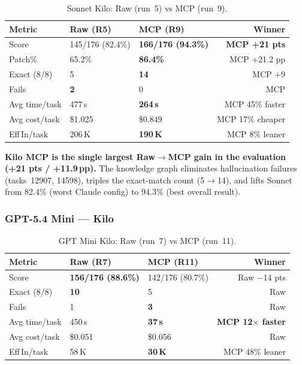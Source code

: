 \begin{table}[h]
\centering
\caption{Sonnet Kilo: Raw (run~5) vs MCP (run~9).}\label{tab:delta-sonnet-kilo}
\begin{tabular}{lllr}
\toprule
\textbf{Metric} & \textbf{Raw (R5)} & \textbf{MCP (R9)} & \textbf{Winner} \\
\midrule
Score          & 145/176 (82.4\%) & \textbf{166/176 (94.3\%)} & \textbf{MCP +21 pts} \\
Patch\%        & 65.2\%           & \textbf{86.4\%}            & MCP +21.2 pp \\
Exact (8/8)    & 5                & \textbf{14}                & MCP +9 \\
Fails          & \textbf{2}       & 0                          & MCP \\
Avg time/task  & 477\,s           & \textbf{264\,s}            & MCP 45\% faster \\
Avg cost/task  & \$1.025          & \$0.849                    & MCP 17\% cheaper \\
Eff\,In/task   & 206\,K           & \textbf{190\,K}            & MCP 8\% leaner \\
\bottomrule
\end{tabular}
\end{table}

\noindent
\textbf{Kilo MCP is the single largest Raw$\to$MCP gain in the evaluation (+21 pts / +11.9\,pp).}
The knowledge graph eliminates hallucination failures (tasks~12907, 14598),
triples the exact-match count (5$\to$14), and lifts Sonnet from
82.4\% (worst Claude config) to 94.3\% (best overall result).

\subsubsection{GPT-5.4 Mini --- Kilo}

\begin{table}[h]
\centering
\caption{GPT Mini Kilo: Raw (run~7) vs MCP (run~11).}\label{tab:delta-mini}
\begin{tabular}{lllr}
\toprule
\textbf{Metric} & \textbf{Raw (R7)} & \textbf{MCP (R11)} & \textbf{Winner} \\
\midrule
Score          & \textbf{156/176 (88.6\%)} & 142/176 (80.7\%) & Raw $-$14 pts \\
Exact (8/8)    & \textbf{10}               & 5                 & Raw \\
Fails          & 1                         & \textbf{3}        & Raw \\
Avg time/task  & 450\,s                    & \textbf{37\,s}    & \textbf{MCP 12$\times$ faster} \\
Avg cost/task  & \$0.051                   & \$0.056           & Raw \\
Eff\,In/task   & 58\,K                     & \textbf{30\,K}    & MCP 48\% leaner \\
\bottomrule
\end{tabular}
\end{table}

